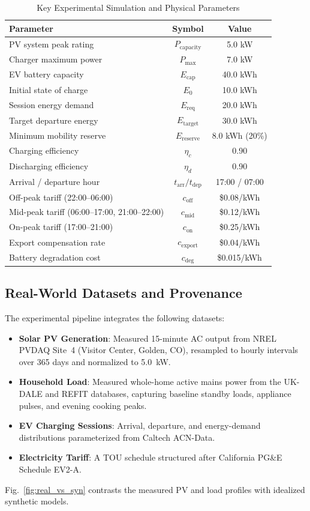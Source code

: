 \documentclass[conference]{IEEEtran}
\begin{document}
\begin{table}[!tb]
\caption{Key Experimental Simulation and Physical Parameters}
\label{tab:params}
\centering
\footnotesize
\renewcommand{\arraystretch}{1.1}
\begin{tabularx}{\columnwidth}{@{}>{\raggedright\arraybackslash}Xcc@{}}
\toprule
\textbf{Parameter} & \textbf{Symbol} & \textbf{Value} \\
\midrule
PV system peak rating & $P_{\text{capacity}}$ & 5.0 kW \\
Charger maximum power & $P_{\max}$ & 7.0 kW \\
EV battery capacity & $E_{\text{cap}}$ & 40.0 kWh \\
Initial state of charge & $E_0$ & 10.0 kWh \\
Session energy demand & $E_{\text{req}}$ & 20.0 kWh \\
Target departure energy & $E_{\text{target}}$ & 30.0 kWh \\
Minimum mobility reserve & $E_{\text{reserve}}$ & 8.0 kWh (20\%) \\
Charging efficiency & $\eta_c$ & 0.90 \\
Discharging efficiency & $\eta_d$ & 0.90 \\
Arrival / departure hour & $t_{\text{arr}} / t_{\text{dep}}$ & 17:00 / 07:00 \\
Off-peak tariff (22:00--06:00) & $c_{\text{off}}$ & \$0.08/kWh \\
Mid-peak tariff (06:00--17:00, 21:00--22:00) & $c_{\text{mid}}$ & \$0.12/kWh \\
On-peak tariff (17:00--21:00) & $c_{\text{on}}$ & \$0.25/kWh \\
Export compensation rate & $c_{\text{export}}$ & \$0.04/kWh \\
Battery degradation cost & $c_{\text{deg}}$ & \$0.015/kWh \\
\bottomrule
\end{tabularx}
\end{table}

\subsection{Real-World Datasets and Provenance}
The experimental pipeline integrates the following datasets:
\begin{itemize}
    \item \textbf{Solar PV Generation}: Measured 15-minute AC output from NREL PVDAQ Site~4 (Visitor Center, Golden, CO), resampled to hourly intervals over 365 days and normalized to 5.0~kW.
    \item \textbf{Household Load}: Measured whole-home active mains power from the UK-DALE and REFIT databases, capturing baseline standby loads, appliance pulses, and evening cooking peaks.
    \item \textbf{EV Charging Sessions}: Arrival, departure, and energy-demand distributions parameterized from Caltech ACN-Data.
    \item \textbf{Electricity Tariff}: A TOU schedule structured after California PG\&E Schedule EV2-A.
\end{itemize}
Fig.~\ref{fig:real_vs_syn} contrasts the measured PV and load profiles with idealized synthetic models.
\end{document}
